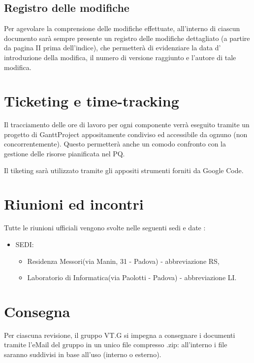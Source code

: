 \section{Registro delle modifiche}
Per agevolare la comprensione delle modifiche effettuate, all'interno di
ciascun documento sar\`a sempre presente un registro delle modifiche dettagliato (a
partire da pagina II prima dell'indice), che permetter\`a di evidenziare la data
d' introduzione della modifica, il numero di versione raggiunto e l'autore di
tale modifica.




\chapter{Ticketing e time-tracking}
\thispagestyle{fancy}
Il tracciamento delle ore di lavoro per ogni componente verr\`a eseguito tramite
un progetto di GanttProject appositamente condiviso ed accessibile da ognuno
(non concorrentemente). Questo permetter\`a anche un comodo confronto con la
gestione delle risorse pianificata nel PQ.

Il tiketing sar\`a utilizzato tramite gli appositi strumenti forniti da Google Code.



\chapter{Riunioni ed incontri}
\thispagestyle{fancy}
Tutte le riunioni ufficiali vengono svolte nelle seguenti sedi e date :
\begin{itemize}
\item SEDI:
\begin{itemize}
\item Residenza Messori(via Manin, 31 - Padova) - abbreviazione RS,
\item Laboratorio di Informatica(via Paolotti - Padova) - abbreviazione LI.
\end{itemize}
\end{itemize}

\chapter{Consegna}
\thispagestyle{fancy}
Per ciascuna revisione, il gruppo VT.G si impegna a consegnare i documenti
tramite l'eMail del gruppo in un unico file compresso .zip: all'interno i file
saranno suddivisi in base all'uso (interno o esterno).

	

